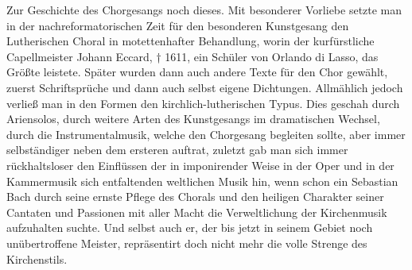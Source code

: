 Zur Geschichte des Chorgesangs noch dieses. Mit besonderer Vorliebe setzte man in der nachreformatorischen Zeit für den besonderen Kunstgesang den Lutherischen Choral in motettenhafter Behandlung, worin der kurfürstliche Capellmeister Johann Eccard, † 1611, ein Schüler von Orlando di Lasso, das Größte leistete. Später wurden dann auch andere Texte für den Chor gewählt, zuerst Schriftsprüche und dann auch selbst eigene Dichtungen. Allmählich jedoch verließ man in den Formen den kirchlich-lutherischen Typus. Dies geschah durch Ariensolos, durch weitere Arten des Kunstgesangs im dramatischen Wechsel, durch die Instrumentalmusik, welche den Chorgesang begleiten sollte, aber immer selbständiger neben dem ersteren auftrat, zuletzt gab man sich immer rückhaltsloser den Einflüssen der in imponirender Weise in der Oper und in der Kammermusik sich entfaltenden weltlichen Musik hin, wenn schon ein Sebastian Bach durch seine ernste Pflege des Chorals und den heiligen Charakter seiner Cantaten und Passionen mit aller Macht die Verweltlichung der Kirchenmusik aufzuhalten suchte. Und selbst auch er, der bis jetzt in seinem Gebiet noch unübertroffene Meister, repräsentirt doch nicht mehr die volle Strenge des Kirchenstils.

